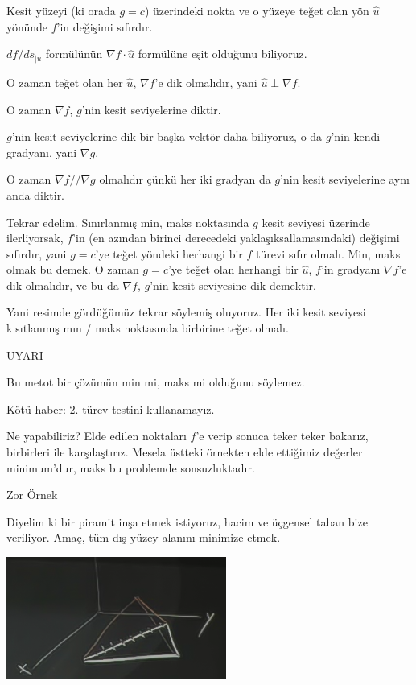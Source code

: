 \documentclass[12pt,fleqn]{article}\usepackage{../../common}
\begin{document}
Kesit yüzeyi (ki orada $g=c$) üzerindeki nokta ve o yüzeye teğet olan yön
$\hat{u}$ yönünde $f$'in değişimi sıfırdır. 

$df / ds_{|\hat{u}}$ formülünün $\nabla f \cdot \hat{u}$ formülüne eşit olduğunu 
 biliyoruz. 

O zaman teğet olan her $\hat{u}$, $\nabla f$'e dik olmalıdır, yani $\hat{u} 
\perp \nabla f$. 

O zaman $\nabla f$, $g$'nin kesit seviyelerine diktir. 

$g$'nin kesit seviyelerine dik bir başka vektör daha biliyoruz, o 
da $g$'nin kendi gradyanı, yani $\nabla g$. 

O zaman $\nabla f // \nabla g$ olmalıdır çünkü her iki gradyan da $g$'nin
kesit seviyelerine aynı anda diktir. 

Tekrar edelim. Sınırlanmış min, maks noktasında $g$ kesit seviyesi üzerinde
ilerliyorsak, $f$'in (en azından birinci derecedeki yaklaşıksallamasındaki)
değişimi sıfırdır, yani $g=c$'ye teğet yöndeki herhangi bir $f$ türevi sıfır
olmalı. Min, maks olmak bu demek. O zaman $g=c$'ye teğet olan herhangi bir
$\hat{u}$, $f$'in gradyanı $\nabla f$'e dik olmalıdır, ve bu da $\nabla f$,
$g$'nin kesit seviyesine dik demektir. 

Yani resimde gördüğümüz tekrar söylemiş oluyoruz. Her iki kesit seviyesi
kısıtlanmış mın / maks noktasında birbirine teğet olmalı.

UYARI

Bu metot bir çözümün min mi, maks mi olduğunu söylemez. 

Kötü haber: 2. türev testini kullanamayız. 

Ne yapabiliriz? Elde edilen noktaları $f$'e verip sonuca teker teker
bakarız, birbirleri ile karşılaştırız. Mesela üstteki örnekten elde
ettiğimiz değerler minimum'dur, maks bu problemde sonsuzluktadır.

Zor Örnek

Diyelim ki bir piramit inşa etmek istiyoruz, hacim ve üçgensel taban bize
veriliyor. Amaç, tüm dış yüzey alanını minimize etmek. 

\includegraphics[height=4cm]{13_8.png}
\end{document}
